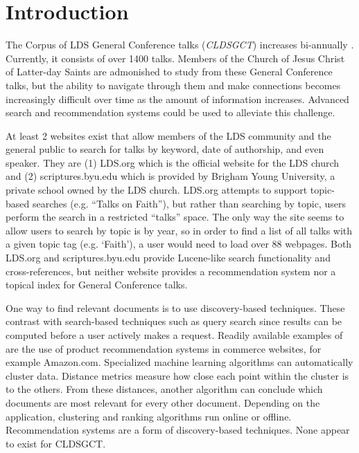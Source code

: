 











\chapter{Introduction}
The Corpus of LDS General Conference talks (\emph{CLDSGCT}) increases bi-annually \cite{davies:gc}. Currently, it consists of over 1400 talks. Members of the Church of Jesus Christ of Latter-day Saints are admonished to study from these General Conference talks, but the ability to navigate through them and make connections becomes increasingly difficult over time as the amount of information increases. Advanced search and recommendation systems could be used to alleviate this challenge.

At least 2 websites exist that allow members of the LDS community and the general public to search for talks by keyword, date of authorship, and even speaker. They are (1) LDS.org which is the official website for the LDS church and (2) scriptures.byu.edu which is provided by Brigham Young University, a private school owned by the LDS church. LDS.org attempts to support topic-based searches (e.g. ``Talks on Faith''), but rather than searching by topic, users perform the search in a restricted ``talks'' space. The only way the site seems to allow users to search by topic is by year, so in order to find a list of all talks with a given topic tag (e.g. ‘Faith’), a user would need to load over 88 webpages. Both LDS.org and scriptures.byu.edu provide Lucene-like search functionality \cite{McCandless:2010:LAS:1893016,lucene:luke} and cross-references, but neither website provides a recommendation system nor a topical index for General Conference talks.

One way to find relevant documents is to use discovery-based techniques. These contrast with search-based techniques such as query search since results can be computed before a user actively makes a request. Readily available examples of are the use of product recommendation systems in commerce websites, for example Amazon.com. Specialized machine learning algorithms can automatically cluster data. Distance metrics measure how close each point within the cluster is to the others. From these distances, another algorithm can conclude which documents are most relevant for every other document. Depending on the application, clustering and ranking algorithms run online or offline. Recommendation systems are a form of discovery-based techniques. None appear to exist for CLDSGCT.

